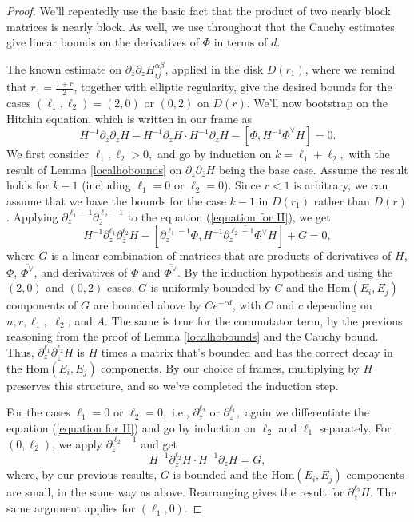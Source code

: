 \documentclass[10pt]{amsart}
\theoremstyle{definition}
\begin{document}
 \begin{proof}
 We'll repeatedly use the basic fact that the product of two nearly block matrices is nearly block. As well, we use throughout that the Cauchy estimates give linear bounds on the derivatives of $\Phi$ in terms of $d$. 
 
 The known estimate on $\partial_{\overline{z}}\partial_z H_{ij}^{\alpha\beta}$, applied in the disk $D(r_1)$, where we remind that $r_1=\frac{1+r}{2}$, together with elliptic regularity, give the desired bounds for the cases $(\ell_1,\ell_2)=(2,0)$ or $(0,2)$ on $D(r)$. We'll now bootstrap on the Hitchin equation, which is written in our frame as
\begin{equation}\label{equation for H}
    H^{-1}\partial_{\overline{z}}\partial_z H - H^{-1}\partial_{\overline{z}}H\cdot H^{-1}\partial_z H-[\Phi,H^{-1}\overline{\Phi}^\vee H]=0.
\end{equation}
 We first consider $\ell_1,\ell_2>0,$ and go by induction on $k=\ell_1+\ell_2,$ with the result of Lemma \ref{localhobounds} on $\partial_z\partial_{\overline{z}}H$ being the base case. Assume the result holds for $k-1$ (including $\ell_1=0$ or $\ell_2=0$). Since $r<1$ is arbitrary, we can assume that we have the bounds for the case $k-1$ in $D(r_1)$ rather than $D(r)$. Applying $\partial_z^{\ell_1-1}\partial_{\overline{z}}^{\ell_2-1}$ to the equation (\ref{equation for H}), we get $$H^{-1}\partial_z^{\ell_1}\partial_{\overline{z}}^{\ell_2}H -[\partial_z^{\ell_1-1}\Phi,H^{-1}\overline{\partial_{z}^{\ell_2-1}\Phi^\vee}H]+G=0,$$ where $G$ is a linear combination of matrices that are products of derivatives of $H$, $\Phi$, $\overline{\Phi^\vee}$, and derivatives of $\Phi$ and $\overline{\Phi^\vee}$. By the induction hypothesis and using the $(2,0)$ and $(0,2)$ cases, $G$ is uniformly bounded by $C$ and the $\textrm{Hom}(E_i,E_j)$ components of $G$ are bounded above by $Ce^{-cd}$, with $C$ and $c$ depending on $n,r,\ell_1,$ $\ell_2$, and $A$. The same is true for the commutator term, by the previous reasoning from the proof of Lemma \ref{localhobounds} and the Cauchy bound.  Thus, $\partial_z^{\ell_1}\partial_{\overline{z}}^{\ell_2}H$ is $H$ times a matrix that's bounded and has the correct decay in the $\textrm{Hom}(E_i,E_j)$ components. By our choice of frames, multiplying by $H$ preserves this structure, and so we've completed the induction step.
     
     For the cases $\ell_1=0$ or $\ell_2=0,$ i.e., $\partial_{\overline{z}}^{\ell_2}$ or $\partial_z^{\ell_1},$ again we differentiate the equation (\ref{equation for H}) and go by induction on $\ell_2$ and $\ell_1$ separately. For $(0,\ell_2)$, we apply $\partial_{\overline{z}}^{\ell_2-1}$ and get
     $$H^{-1}\partial_{\overline{z}}^{\ell_2}H\cdot H^{-1}\partial_z H = G,$$ where, by our previous results, $G$ is bounded and the $\textrm{Hom}(E_i,E_j)$ components are small, in the same way as above. Rearranging gives the result for $\partial_{\overline{z}}^{\ell_2}H$. The same argument applies for $(\ell_1,0).$
 \end{proof}
 
\end{document}
